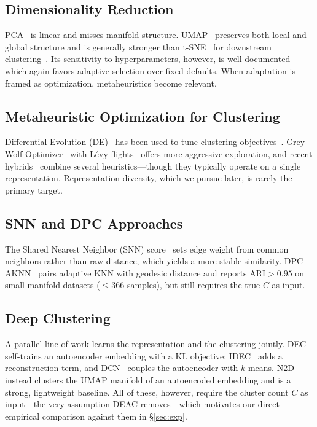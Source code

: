 \documentclass[journal]{IEEEtran}
\begin{document}
\subsection{Dimensionality Reduction}
PCA~\cite{jolliffe2002principal} is linear and misses manifold structure. UMAP~\cite{mcinnes2018umap} preserves both local and global structure and is generally stronger than t-SNE~\cite{van2008visualizing} for downstream clustering~\cite{becht2019dimensionality}. Its sensitivity to hyperparameters, however, is well documented---which again favors adaptive selection over fixed defaults. When adaptation is framed as optimization, metaheuristics become relevant.

\subsection{Metaheuristic Optimization for Clustering}
Differential Evolution (DE)~\cite{storn1997differential} has been used to tune clustering objectives~\cite{das2008automatic}. Grey Wolf Optimizer~\cite{mirjalili2014grey} with L\'{e}vy flights~\cite{yang2010nature} offers more aggressive exploration, and recent hybrids~\cite{faris2018grey} combine several heuristics---though they typically operate on a single representation. Representation diversity, which we pursue later, is rarely the primary target.

\subsection{SNN and DPC Approaches}
The Shared Nearest Neighbor (SNN) score~\cite{ertoz2003finding} sets edge weight from common neighbors rather than raw distance, which yields a more stable similarity. DPC-AKNN~\cite{wang2026density} pairs adaptive KNN with geodesic distance and reports ARI${>}0.95$ on small manifold datasets (${\leq}366$ samples), but still requires the true $C$ as input.

\subsection{Deep Clustering}
A parallel line of work learns the representation and the clustering jointly. DEC~\cite{xie2016unsupervised} self-trains an autoencoder embedding with a KL objective; IDEC~\cite{guo2017improved} adds a reconstruction term, and DCN~\cite{yang2017towards} couples the autoencoder with $k$-means. N2D~\cite{mcconville2021n2d} instead clusters the UMAP manifold of an autoencoded embedding and is a strong, lightweight baseline. All of these, however, require the cluster count $C$ as input---the very assumption DEAC removes---which motivates our direct empirical comparison against them in \S\ref{sec:exp}.
\end{document}
